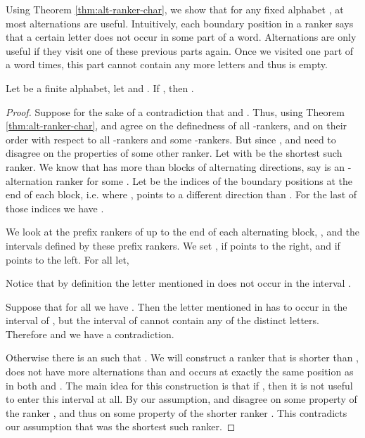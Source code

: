 \documentclass{LMCS}
\begin{document}
Using Theorem \ref{thm:alt-ranker-char}, we show that for any fixed alphabet
, at most  alternations are useful. Intuitively, each
boundary position in a ranker says that a certain letter does not occur in
some part of a word. Alternations are only useful if they visit one of these
previous parts again. Once we visited one part of a word  times,
this part cannot contain any more letters and thus is empty.

\begin{thm} \label{thm:alt-alphabet}
  Let  be a finite alphabet, let  and . If , then .
\end{thm}

\begin{full}
\begin{proof}
  Suppose for the sake of a contradiction that 
  and . Thus, using Theorem \ref{thm:alt-ranker-char},
   and  agree on the definedness of all -rankers, and
  on their order with respect to all -rankers and some
  -rankers. But since ,  and 
  need to disagree on the properties of some other ranker. Let  with  be the shortest such ranker. We know that
   has more than  blocks of alternating directions, say  is
  an -alternation ranker for some . Let  be the indices of the boundary positions at the end of each
  block, i.e. where ,  points to a different direction
  than . For the last of those indices we have .

We look at the prefix rankers of  up to the
  end of each alternating block, ,
  and the
  intervals defined by these prefix rankers. We set ,
   if  points to the right, and  if 
  points to the left. For all  let,
  
  Notice that by definition the letter mentioned in  does not occur
  in the interval .

  Suppose that for all  we have .  Then the
  letter mentioned in  has to occur in the interval  of , but
  the interval  of  cannot contain any of the 
  distinct letters. Therefore  and
  we have a contradiction.

  Otherwise there is an  such that . We will construct a ranker  that is shorter than ,
  does not have more alternations than  and occurs at exactly the same
  position as  in both  and . The main idea for this construction
  is that if , then it is not useful to enter
  this interval at all. By our assumption,  and 
  disagree on some property of the ranker , and thus on some property of
  the shorter ranker . This contradicts our assumption that  was the
  shortest such ranker.


\end{proof}
\end{full}
\end{document}
